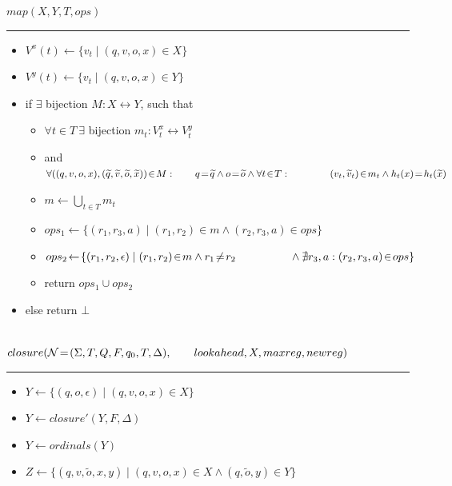 \documentclass{article}
\newcommand{\Xset}{\!\leftarrow\!}
\newcommand{\Xin}{\!\in\!}
\newcommand{\Xeq}{\!=\!}
\newcommand{\XN}{\mathcal{N}}
\theoremstyle{definition}
\begin{document}
\begin{multicols}{2}
    $map(X, Y, T, ops)$
    \hrule
    \begin{itemize}[leftmargin=0in]
        \smallskip
        \item[] $V^x(t) \Xset \{v_t \mid (q, v, o, x) \Xin X \}$
        \item[] $V^y(t) \Xset \{v_t \mid (q, v, o, x) \Xin Y \}$
        \smallskip
        \item[] if $\exists$ bijection $M: X \leftrightarrow Y$, such that
        \begin{itemize}
            \item[] $\forall t \Xin T\ \exists$ bijection $m_t: V^x_t \leftrightarrow V^y_t$
            \item[] and $\forall ((q, v, o, x), (\widetilde{q}, \widetilde{v}, \widetilde{o}, \widetilde{x})) \Xin M: \\
                \hphantom{\hspace{2em}} q \Xeq \widetilde{q} \wedge o \Xeq \widetilde{o} \wedge \forall t \Xin T: \\
                    \hphantom{\hspace{4em}} (v_t, \widetilde{v}_t) \Xin m_t \wedge h_t(x) \Xeq h_t(\widetilde{x})$
            \smallskip
            \item[] $m \Xset \bigcup_{t \in T} m_t$
            \item[] $ops_1 \Xset \{ (r_1, r_3, a) \mid (r_1, r_2) \Xin m \wedge (r_2, r_3, a) \Xin ops \}$
            \item[] $ops_2 \Xset \{ (r_1, r_2, \epsilon) \mid (r_1, r_2) \Xin m \wedge r_1 \!\neq\! r_2 \\
                \hphantom{hspace{2em}} \wedge \nexists r_3, a: (r_2, r_3, a) \Xin ops \}$
            \item[] return $ops_1 \cup ops_2$
        \end{itemize}
        \smallskip
        \item[] else return $\bot$
        \\ \\
    \end{itemize}

    $closure(\XN \Xeq (\Sigma, T, Q, F, q_0, T, \Delta), \\
        \hphantom{\hspace{2em}} lookahead, X, maxreg, newreg)$
    \hrule
    \begin{itemize}[leftmargin=0in]
        \smallskip
        \item[] $Y \Xset \{(q, o, \epsilon) \mid (q, v, o, x) \Xin X \}$
        \item[] $Y \Xset closure' (Y, F, \Delta)$
        \item[] $Y \Xset ordinals (Y)$
        \item[] $Z \Xset \{(q, v, \widetilde{o}, x, y) \mid (q, v, o, x) \Xin X \wedge (q, \widetilde{o}, y) \Xin Y \}$


\end{itemize}
\end{multicols}
\end{document}
